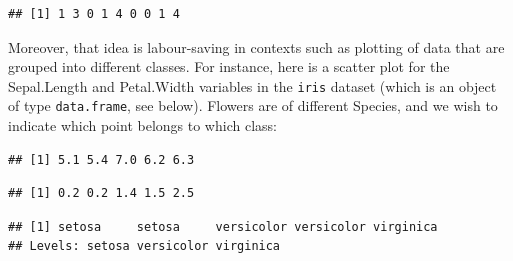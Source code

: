 \documentclass[10pt,b5paper,krantz1]{krantz}
\newenvironment{Shaded}{\begin{snugshade}}{\end{snugshade}}
\newcommand{\CommentTok}[1]{\textcolor[rgb]{0.37,0.37,0.37}{\textit{#1}}}
\newcommand{\DecValTok}[1]{\textcolor[rgb]{0.06,0.06,0.06}{#1}}
\newcommand{\KeywordTok}[1]{\textcolor[rgb]{0.27,0.27,0.27}{\textbf{#1}}}
\newcommand{\NormalTok}[1]{#1}
\newcommand{\OperatorTok}[1]{\textcolor[rgb]{0.43,0.43,0.43}{\textbf{#1}}}
\newcommand{\StringTok}[1]{\textcolor[rgb]{0.5,0.5,0.5}{#1}}
\begin{document}
\begin{verbatim}
## [1] 1 3 0 1 4 0 0 1 4
\end{verbatim}

Moreover, that idea is labour-saving in contexts such as plotting
of data that are grouped into different classes.
For instance, here is a scatter plot
for the Sepal.Length and Petal.Width variables in the \texttt{iris} dataset (which
is an object of type \texttt{data.frame}, see below).
Flowers are of different Species, and we wish to indicate which point belongs
to which class:

\begin{Shaded}
\end{Shaded}

\begin{verbatim}
## [1] 5.1 5.4 7.0 6.2 6.3
\end{verbatim}

\begin{Shaded}
\end{Shaded}

\begin{verbatim}
## [1] 0.2 0.2 1.4 1.5 2.5
\end{verbatim}

\begin{Shaded}
\end{Shaded}

\begin{verbatim}
## [1] setosa     setosa     versicolor versicolor virginica 
## Levels: setosa versicolor virginica
\end{verbatim}

\begin{Shaded}
\end{Shaded}
\end{document}

